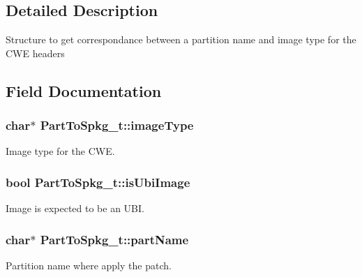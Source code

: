 \subsection{Detailed Description}
Structure to get correspondance between a partition name and image type for the C\+WE headers 

\subsection{Field Documentation}
\subsubsection[{\texorpdfstring{image\+Type}{imageType}}]{\setlength{\rightskip}{0pt plus 5cm}char$\ast$ Part\+To\+Spkg\+\_\+t\+::image\+Type}\hypertarget{struct_part_to_spkg__t_ab7ee6f2d56ac53cfddf7051581516d0f}{}\label{struct_part_to_spkg__t_ab7ee6f2d56ac53cfddf7051581516d0f}


Image type for the C\+WE. 

\subsubsection[{\texorpdfstring{is\+Ubi\+Image}{isUbiImage}}]{\setlength{\rightskip}{0pt plus 5cm}bool Part\+To\+Spkg\+\_\+t\+::is\+Ubi\+Image}\hypertarget{struct_part_to_spkg__t_a101617360579c847f62feaabad840390}{}\label{struct_part_to_spkg__t_a101617360579c847f62feaabad840390}


Image is expected to be an U\+BI. 

\subsubsection[{\texorpdfstring{part\+Name}{partName}}]{\setlength{\rightskip}{0pt plus 5cm}char$\ast$ Part\+To\+Spkg\+\_\+t\+::part\+Name}\hypertarget{struct_part_to_spkg__t_afacd3fe7740e3294350e8c63d5e9d9e1}{}\label{struct_part_to_spkg__t_afacd3fe7740e3294350e8c63d5e9d9e1}


Partition name where apply the patch. 


